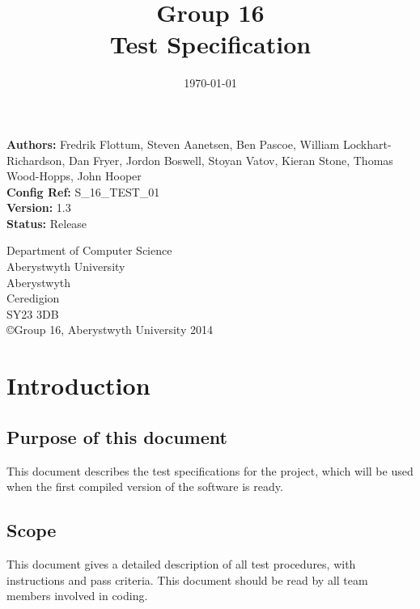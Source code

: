 \documentclass[10pt,a4paper]{article}
\begin{document}
\begin{titlepage}

\title{\textbf{Group 16\\Test Specification}}
\date{\today}
\clearpage\maketitle
\thispagestyle{empty}

\begin{raggedright}
\textbf{Authors:} Fredrik Flottum, Steven Aanetsen, Ben Pascoe, William Lockhart-Richardson, Dan Fryer, Jordon Boswell, Stoyan Vatov, Kieran Stone, Thomas Wood-Hopps, John Hooper\\
\textbf{Config Ref:} S\_16\_TEST\_01\\
\textbf{Version:} 1.3\\
\textbf{Status:} Release\\
\end{raggedright}

\vfill
\begin{raggedright} Department of Computer Science\\
Aberystwyth University\\
Aberystwyth\\
Ceredigion\\
SY23 3DB\\
\copyright \thinspace  Group 16, Aberystwyth University 2014\\
\end{raggedright}

\end{titlepage}

\tableofcontents
\newpage

\section{Introduction}
\subsection{Purpose of this document}
This document describes the test specifications for the project, which will be used when the first compiled version of the software is ready.

\subsection{Scope}
This document gives a detailed description of all test procedures, with instructions and pass criteria. This document should be read by all team members involved in coding.
\end{document}
